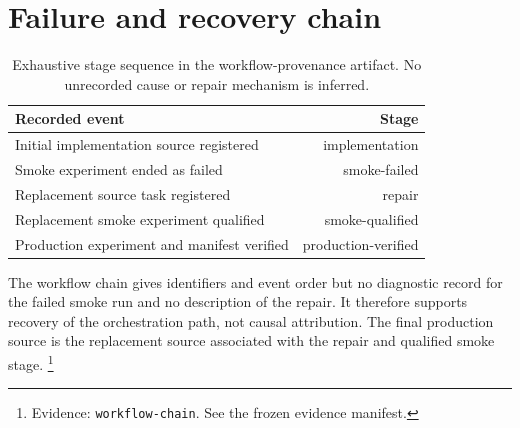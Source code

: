 \documentclass[10pt,twocolumn,letterpaper]{article}
\begin{document}
\section{Failure and recovery chain}\label{workflow-chain}
\begin{table}[H]\centering\normalsize
\caption{Exhaustive stage sequence in the workflow-provenance artifact. No unrecorded cause or repair mechanism is inferred.}
\begin{tabularx}{\textwidth}{@{}Xr@{}}
\toprule
Recorded event & Stage \\ \midrule
Initial implementation source registered & implementation \\
Smoke experiment ended as failed & smoke-failed \\
Replacement source task registered & repair \\
Replacement smoke experiment qualified & smoke-qualified \\
Production experiment and manifest verified & production-verified \\
\bottomrule\end{tabularx}\end{table}
The workflow chain gives identifiers and event order but no diagnostic record for the failed smoke run and no description of the repair. It therefore supports recovery of the orchestration path, not causal attribution. The final production source is the replacement source associated with the repair and qualified smoke stage. \footnote{Evidence: \texttt{workflow-chain}. See the frozen evidence manifest.}
\end{document}
